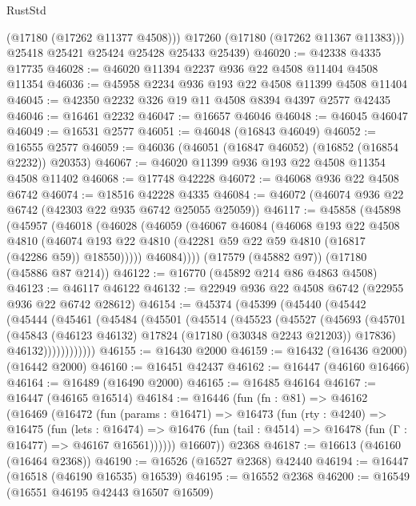 \begin{lexlean}{RustStd}
\begin{coremodule}
          (@17180 (@17262 @11377 @4508)))
        @17260
        (@17180 (@17262 @11367 @11383)))
      @25418
      @25421
      @25424
      @25428
      @25433
      @25439)
@46020 := @42338 @4335 @17735
@46028 := @46020 @11394 @2237 @936 @22 @4508 @11404 @4508 @11354
@46036 := @45958 @2234 @936 @193 @22 @4508 @11399 @4508 @11404
@46045 := @42350 @2232 @326 @19 @11 @4508 @8394 @4397 @2577 @42435
@46046 := @16461 @2232
@46047 := @16657 @46046
@46048 := @46045 @46047
@46049 := @16531 @2577
@46051 := @46048 (@16843 @46049)
@46052 := @16555 @2577
@46059 := @46036 (@46051 (@16847 @46052) (@16852 (@16854 @2232)) @20353)
@46067 := @46020 @11399 @936 @193 @22 @4508 @11354 @4508 @11402
@46068 := @17748 @42228
@46072 := @46068 @936 @22 @4508 @6742
@46074 := @18516 @42228 @4335
@46084 := @46072 (@46074 @936 @22 @6742 (@42303 @22 @935 @6742 @25055 @25059))
@46117 := @45858
    (@45898
      (@45957
        (@46018
          (@46028
            (@46059
              (@46067
                @46084
                (@46068
                  @193
                  @22
                  @4508
                  @4810
                  (@46074 @193 @22 @4810 (@42281 @59 @22 @59 @4810 (@16817 (@42286 @59)) @18550)))))
            @46084))))
    (@17579 (@45882 @97))
    (@17180 (@45886 @87 @214))
@46122 := @16770 (@45892 @214 @86 @4863 @4508)
@46123 := @46117 @46122
@46132 := @22949 @936 @22 @4508 @6742 (@22955 @936 @22 @6742 @28612)
@46154 := @45374
    (@45399
      (@45440
        (@45442
          (@45444
            (@45461
              (@45484
                (@45501
                  (@45514
                    (@45523
                      (@45527
                        (@45693
                          (@45701
                            (@45843 (@46123 @46132) @17824 (@17180 (@30348 @2243 @21203)) @17836)
                            @46132))))))))))))
@46155 := @16430 @2000
@46159 := @16432 (@16436 @2000) (@16442 @2000)
@46160 := @16451 @42437
@46162 := @16447 (@46160 @16466)
@46164 := @16489 (@16490 @2000)
@46165 := @16485 @46164
@46167 := @16447 (@46165 @16514)
@46184 := @16446
    (fun (fn : @81) =>
    @46162
      (@16469
        (@16472
          (fun (params : @16471) =>
          @16473
            (fun (rty : @4240) =>
            @16475
              (fun (lets : @16474) =>
              @16476 (fun (tail : @4514) => @16478 (fun (Γ : @16477) => @46167 @16561))))))
        @16607))
    @2368
@46187 := @16613 (@46160 (@16464 @2368))
@46190 := @16526 (@16527 @2368) @42440
@46194 := @16447 (@16518 (@46190 @16535) @16539)
@46195 := @16552 @2368
@46200 := @16549 (@16551 @46195 @42443 @16507 @16509)

\end{coremodule}
\end{lexlean}
